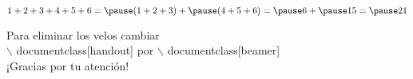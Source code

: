 \documentclass[handout]{beamer}
\begin{document}
\begin{frame}
	\[1+2+3+4+5+6= \pause(1+2+3)+\pause(4+5+6) = \pause6 + \pause 15= \pause 21\]
	
	\pause Para eliminar los velos cambiar\\
	 $\backslash\!\!$ documentclass[handout] por  $\backslash\!\!$ documentclass[beamer]\\\Large{¡Gracias por tu atención!}
\end{frame}
\end{document}
